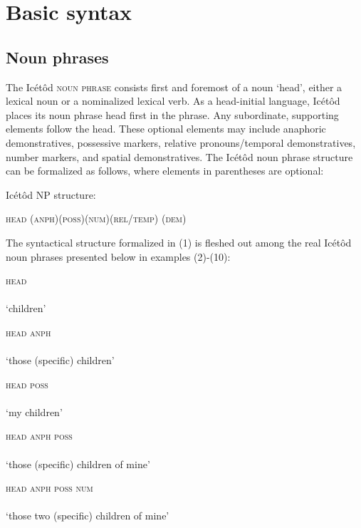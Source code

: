 \section{Basic syntax}



\subsection{Noun phrases}


The Icétôd \textsc{noun phrase} consists first and foremost of a noun ‘head’, either a lexical noun or a nominalized lexical verb. As a head-initial language, Icétôd places its noun phrase head first in the phrase. Any subordinate, supporting elements follow the head. These optional elements may include anaphoric demonstratives, possessive markers, relative pronouns/temporal demonstratives, number markers, and spatial demonstratives. The Icétôd noun phrase structure can be formalized as follows, where elements in parentheses are optional:




Icétôd NP structure: 

\textsc{head (anph)(poss)(num)(rel/temp) (dem)}


The syntactical structure formalized in (1) is fleshed out among the real Icétôd noun phrases presented below in examples (2)-(10):



\textsc{head}
\ea\label{ex:}
 \\
    \\
\glt ‘children’ 
\z




\textsc{head anph}
\ea\label{ex:}
 \\
    \\
\glt ‘those (specific) children’ 
\z




\textsc{head poss}
\ea\label{ex:}
 \\
    \\
\glt ‘my children’ 
\z




\textsc{head anph poss}
\ea\label{ex:}
 \\
    \\
\glt ‘those (specific) children of mine’ 
\z




\textsc{head anph poss num}
\ea\label{ex:}
 \\
    \\
\glt ‘those two (specific) children of mine’ 
\z




